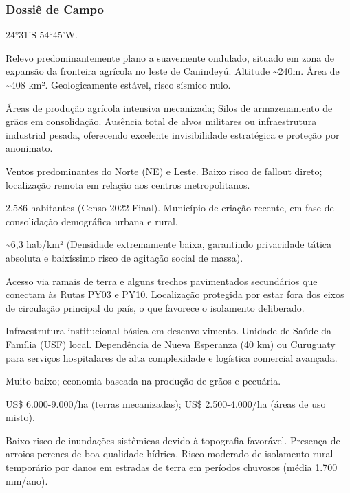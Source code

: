 \subsubsection{Dossiê de Campo}
\begin{description}[style=nextline,leftmargin=0.5cm,font=\bfseries]
\item[Coordenadas]  24°31'S 54°45'W.
\item[Topographical]  Relevo predominantemente plano a suavemente ondulado, situado em zona de expansão da fronteira agrícola no leste de Canindeyú. Altitude \textasciitilde 240m. Área de \textasciitilde 408 km². Geologicamente estável, risco sísmico nulo.
\item[Alvos Estratégicos]  Áreas de produção agrícola intensiva mecanizada; Silos de armazenamento de grãos em consolidação. Ausência total de alvos militares ou infraestrutura industrial pesada, oferecendo excelente invisibilidade estratégica e proteção por anonimato.
\item[Fallout]  Ventos predominantes do Norte (NE) e Leste. Baixo risco de fallout direto; localização remota em relação aos centros metropolitanos.
\item[População]  2.586 habitantes (Censo 2022 Final). Município de criação recente, em fase de consolidação demográfica urbana e rural.
\item[Densidade]  \textasciitilde 6,3 hab/\allowbreak km² (Densidade extremamente baixa, garantindo privacidade tática absoluta e baixíssimo risco de agitação social de massa).
\item[Vias de Acesso]  Acesso via ramais de terra e alguns trechos pavimentados secundários que conectam às Rutas PY03 e PY10. Localização protegida por estar fora dos eixos de circulação principal do país, o que favorece o isolamento deliberado.
\item[Serviços]  Infraestrutura institucional básica em desenvolvimento. Unidade de Saúde da Família (USF) local. Dependência de Nueva Esperanza (40 km) ou Curuguaty para serviços hospitalares de alta complexidade e logística comercial avançada.
\item[Custo de Vida]  Muito baixo; economia baseada na produção de grãos e pecuária.
\item[Preço da Terra]  US\$ 6.000-9.000/\allowbreak ha (terras mecanizadas); US\$ 2.500-4.000/\allowbreak ha (áreas de uso misto).
\item[Hidrologia]  Baixo risco de inundações sistêmicas devido à topografia favorável. Presença de arroios perenes de boa qualidade hídrica. Risco moderado de isolamento rural temporário por danos em estradas de terra em períodos chuvosos (média 1.700 mm/\allowbreak ano).

\end{description}

